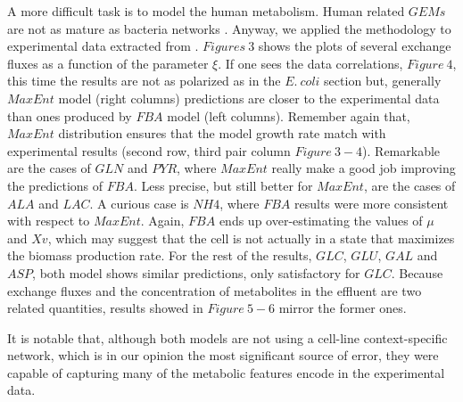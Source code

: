 \documentclass[]{article}
\begin{document}
	A more difficult task is to model the human metabolism. 
	Human related $GEMs$ are not as mature as bacteria networks . 
	Anyway, we applied the methodology to experimental data extracted from . 
	$Figures\ 3$ shows the plots of several exchange fluxes as a function of the parameter $\xi$. 
	If one sees the data correlations, $Figure\ 4$, this time the results are not as polarized as in the $E.\ coli$ section but, generally $MaxEnt$ model (right columns) predictions are closer to the experimental data than ones produced by $FBA$ model (left columns). 
	Remember again that, $MaxEnt$ distribution ensures that the model growth rate match with experimental results (second row, third pair column $Figure\ 3 - 4$).
	Remarkable are the cases of $GLN$ and $PYR$, where $MaxEnt$ really make a good job improving the predictions of $FBA$. 
	Less precise, but still better for $MaxEnt$, are the cases of $ALA$ and $LAC$.  A curious case is $NH4$, where $FBA$ results were more consistent with respect to $MaxEnt$.
	Again, $FBA$ ends up over-estimating the values of $\mu$ and $Xv$, which may suggest that the cell is not actually in a state that maximizes the biomass production rate.
	For the rest of the results, $GLC$, $GLU$, $GAL$ and $ASP$, both model shows similar predictions, only satisfactory for $GLC$. 
	Because exchange fluxes and the concentration of metabolites in the effluent are two related quantities, results showed in $Figure\ 5 - 6$ mirror the former ones.
	
	It is notable that, although both models are not using a cell-line context-specific network, which is in our opinion the most significant source of error, they were capable of capturing many of the metabolic features encode in the experimental data.
	
\end{document}
